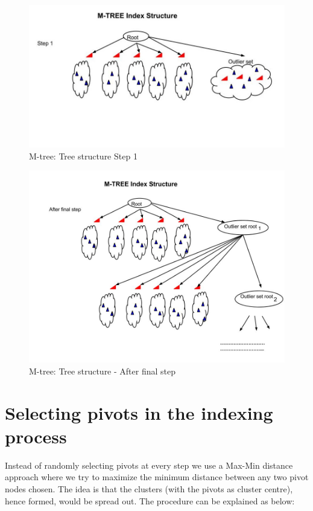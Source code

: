 \begin{figure}[ht]	
\centering
\includegraphics[width=1 \columnwidth]{img/image0d.jpg}
\caption{M-tree: Tree structure Step 1}
\label{fig: step1}
\end{figure}


\begin{figure}[ht]	
\centering
\includegraphics[width=1 \columnwidth]{img/image0e.jpg}
\caption{M-tree: Tree structure - After final step}
\label{fig: final step}
\end{figure}



\section{Selecting pivots in the indexing process}

Instead of randomly selecting pivots at every step we use a Max-Min distance approach where we try to maximize the minimum distance between any two pivot nodes chosen. The idea is that the clusters (with the pivots as cluster centre), hence formed, would be spread out. The procedure can be explained as below:


